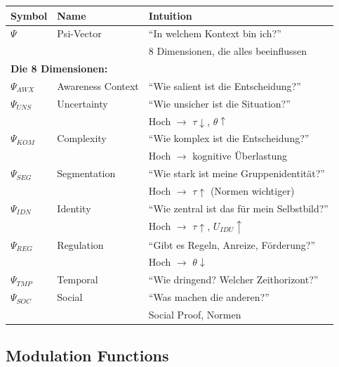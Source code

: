 \begin{longtable}{p{2cm}p{4cm}p{7cm}}
\toprule
\textbf{Symbol} & \textbf{Name} & \textbf{Intuition} \\
\midrule
\endhead

$\Psi$ & Psi-Vector & 
``In welchem Kontext bin ich?'' \\
& & 8 Dimensionen, die alles beeinflussen \\[6pt]

\midrule
\multicolumn{3}{l}{\textbf{Die 8 Dimensionen:}} \\
\midrule

$\Psi_{AWX}$ & Awareness Context & 
``Wie salient ist die Entscheidung?'' \\[4pt]

$\Psi_{UNS}$ & Uncertainty & 
``Wie unsicher ist die Situation?'' \\
& & Hoch $\to$ $\tau \downarrow$, $\theta \uparrow$ \\[4pt]

$\Psi_{KOM}$ & Complexity & 
``Wie komplex ist die Entscheidung?'' \\
& & Hoch $\to$ kognitive Überlastung \\[4pt]

$\Psi_{SEG}$ & Segmentation & 
``Wie stark ist meine Gruppenidentität?'' \\
& & Hoch $\to$ $\tau \uparrow$ (Normen wichtiger) \\[4pt]

$\Psi_{IDN}$ & Identity & 
``Wie zentral ist das für mein Selbstbild?'' \\
& & Hoch $\to$ $\tau \uparrow$, $U_{IDU} \uparrow$ \\[4pt]

$\Psi_{REG}$ & Regulation & 
``Gibt es Regeln, Anreize, Förderung?'' \\
& & Hoch $\to$ $\theta \downarrow$ \\[4pt]

$\Psi_{TMP}$ & Temporal & 
``Wie dringend? Welcher Zeithorizont?'' \\[4pt]

$\Psi_{SOC}$ & Social & 
``Was machen die anderen?'' \\
& & Social Proof, Normen \\[4pt]

\bottomrule
\end{longtable}

\subsection{Modulation Functions}

